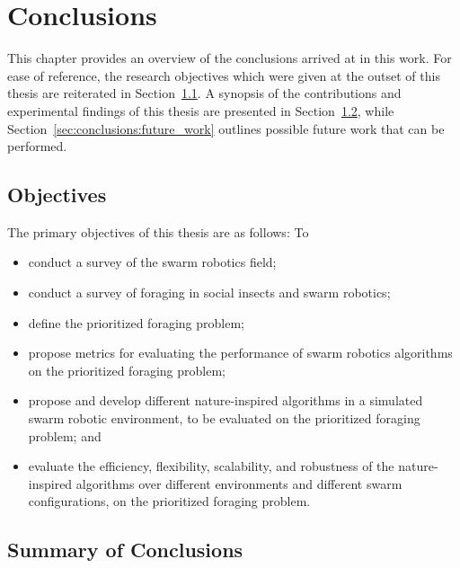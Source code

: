 
\chapter{Conclusions}
\label{chap:conclusions}

This chapter provides an overview of the conclusions arrived at in this work. For ease of reference, the research objectives which were given at the outset of this thesis are reiterated in Section~\ref{sec:introduction:objectives}. A synopsis of the contributions and experimental findings of this thesis are presented in Section~\ref{sec:conclusions:conclusion_summary}, while Section~\ref{sec:conclusions:future_work} outlines possible future work that can be performed.


\section{Objectives}
\label{sec:introduction:objectives}

The primary objectives of this thesis are as follows: To

\begin{itemize}
	\item conduct a survey of the swarm robotics field;
	\item conduct a survey of foraging in social insects and  swarm robotics;
	\item define the prioritized foraging problem;
	\item propose metrics for evaluating the performance of swarm robotics algorithms on the prioritized foraging problem;
	\item propose and develop different nature-inspired algorithms in a simulated swarm robotic environment, to be evaluated on the prioritized foraging problem; and
	\item evaluate the efficiency, flexibility, scalability, and robustness of the nature-inspired algorithms over different environments and different swarm configurations, on the prioritized foraging problem.
\end{itemize}



\section{Summary of Conclusions}
\label{sec:conclusions:conclusion_summary}

